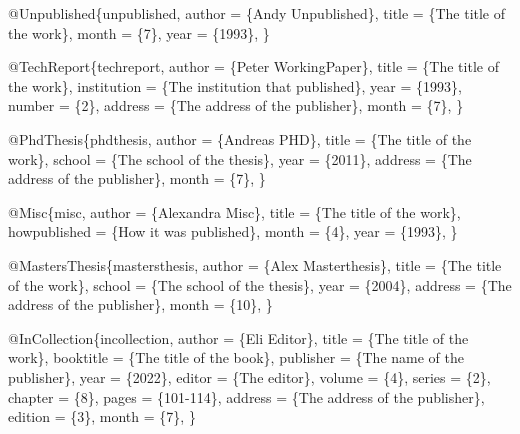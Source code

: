 \documentclass[
  stu,
  floatsintext,
  longtable,
  a4paper,
  nolmodern,
  notxfonts,
  notimes,
  donotrepeattitle,
  colorlinks=true,linkcolor=blue,citecolor=blue,urlcolor=blue]{apa7}
\newenvironment{Shaded}{\begin{snugshade}}{\end{snugshade}}
\newcommand{\NormalTok}[1]{\textcolor[rgb]{0.00,0.23,0.31}{#1}}
\begin{document}
\begin{Shaded}
\begin{Highlighting}[]
\NormalTok{    @Unpublished\{unpublished,}
\NormalTok{        author = \{Andy Unpublished\},}
\NormalTok{        title  = \{The title of the work\},}
\NormalTok{        month  = \{7\},}
\NormalTok{        year   = \{1993\},}
\NormalTok{    \}}
    
\NormalTok{    @TechReport\{techreport,}
\NormalTok{        author      = \{Peter WorkingPaper\},}
\NormalTok{        title       = \{The title of the work\},}
\NormalTok{        institution = \{The institution that published\},}
\NormalTok{        year        = \{1993\},}
\NormalTok{        number      = \{2\},}
\NormalTok{        address     = \{The address of the publisher\},}
\NormalTok{        month       = \{7\},}
\NormalTok{    \}}
    
\NormalTok{    @PhdThesis\{phdthesis,}
\NormalTok{        author  = \{Andreas PHD\},}
\NormalTok{        title   = \{The title of the work\},}
\NormalTok{        school  = \{The school of the thesis\},}
\NormalTok{        year    = \{2011\},}
\NormalTok{        address = \{The address of the publisher\},}
\NormalTok{        month   = \{7\},}
\NormalTok{    \}}
    
\NormalTok{    @Misc\{misc,}
\NormalTok{        author       = \{Alexandra Misc\},}
\NormalTok{        title        = \{The title of the work\},}
\NormalTok{        howpublished = \{How it was published\},}
\NormalTok{        month        = \{4\},}
\NormalTok{        year         = \{1993\},}
\NormalTok{    \}}
    
\NormalTok{    @MastersThesis\{mastersthesis,}
\NormalTok{        author  = \{Alex Masterthesis\},}
\NormalTok{        title   = \{The title of the work\},}
\NormalTok{        school  = \{The school of the thesis\},}
\NormalTok{        year    = \{2004\},}
\NormalTok{        address = \{The address of the publisher\},}
\NormalTok{        month   = \{10\},}
\NormalTok{    \}}
    
\NormalTok{    @InCollection\{incollection,}
\NormalTok{        author    = \{Eli Editor\},}
\NormalTok{        title     = \{The title of the work\},}
\NormalTok{        booktitle = \{The title of the book\},}
\NormalTok{        publisher = \{The name of the publisher\},}
\NormalTok{        year      = \{2022\},}
\NormalTok{        editor    = \{The editor\},}
\NormalTok{        volume    = \{4\},}
\NormalTok{        series    = \{2\},}
\NormalTok{        chapter   = \{8\},}
\NormalTok{        pages     = \{101{-}114\},}
\NormalTok{        address   = \{The address of the publisher\},}
\NormalTok{        edition   = \{3\},}
\NormalTok{        month     = \{7\},}
\NormalTok{    \}}
    

\end{Highlighting}
\end{Shaded}
\end{document}

